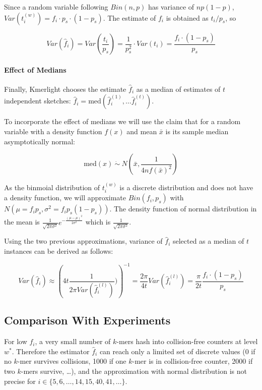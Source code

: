 Since a random variable following $Bin(n, p)$ has variance of $np(1-p)$, 
$Var(t_i^{(w)}) = f_i \cdot p_s \cdot (1-p_s)$. The estimate of $f_i$ is obtained
as $t_i / p_s$, so

$$ Var(\hat f_i) = Var \left( \frac{t_i}{p_s} \right) = \frac{1}{p_s^2} \cdot Var(t_i) = \frac{f_i \cdot (1 - p_s)}{p_s} $$

\paragraph{Effect of Medians}
Finally, Kmerlight chooses the estimate $\hat f_i$ as a median of estimates of $t$ 
independent sketches: $\hat f_i = \mathrm{med}(\hat f_i^{(1)}, \dots \hat f_i^{(t)})$.

To incorporate the effect of medians we will use the claim that for a random
variable with a density function $f(x)$ and mean $\bar x$ is its sample median
asymptotically normal:

$$\mathrm{med}(x) ~\dot\sim~ N\left(\bar x, \frac{1}{4nf(\bar x)^2}\right)$$

As the binmoial distribution of $t_i^{(w)}$ is a discrete distribution and does
not have a density function, we will approximate $Bin(f_i, p_s)$ with
$N(\mu = f_i p_s, \sigma^2 = f_i p_s(1-p_s))$. The density function of normal distribution
in the mean is $\frac{1}{\sqrt{2\pi\sigma^2}} e^{-\frac{(\mu - \mu)^2}{2\sigma^2}}$
which is $\frac{1}{\sqrt{2\pi\sigma^2}}$.

Using the two previous approximations, variance of $\hat f_i$ selected as a median of
$t$ instances can be derived as follows:

\begin{equation} \label{eq:variance}
Var(\hat f_i) \approx \left( 4t\frac{1}{2\pi Var(\hat f_i^{(l)})}) \right)^{-1} =
\frac{2\pi}{4t} Var(\hat f_i^{(l)}) = \frac{\pi}{2t} \frac{f_i \cdot (1 - p_s)}{p_s}
\end{equation}


\subsection{Comparison With Experiments}
For low $f_i$, a very small number of $k$-mers hash into collision-free counters at level $w^*$.
Therefore the estimator $\hat f_i$ can reach only a limited set of discrete values (0 if no $k$-mer
survives collisions, 1000 if one $k$-mer is in collision-free counter, 2000 if two $k$-mers survive, \dots),
and the approximation with normal distribution is not precise for $i \in \{ 5, 6, \dots, 14, 15, 40, 41, \dots\}$.

